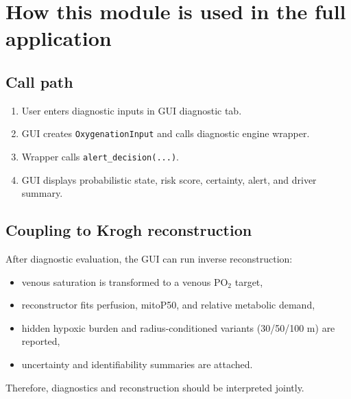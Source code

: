 \documentclass[12pt,a4paper]{article}
\begin{document}
\section{How this module is used in the full application}
\subsection{Call path}
\begin{enumerate}
    \item User enters diagnostic inputs in GUI diagnostic tab.
    \item GUI creates \texttt{OxygenationInput} and calls diagnostic engine wrapper.
    \item Wrapper calls \texttt{alert\_decision(...)}.
    \item GUI displays probabilistic state, risk score, certainty, alert, and driver summary.
\end{enumerate}

\subsection{Coupling to Krogh reconstruction}
After diagnostic evaluation, the GUI can run inverse reconstruction:
\begin{itemize}
    \item venous saturation is transformed to a venous PO$_2$ target,
    \item reconstructor fits perfusion, mitoP50, and relative metabolic demand,
    \item hidden hypoxic burden and radius-conditioned variants (30/50/100 \textmu m) are reported,
    \item uncertainty and identifiability summaries are attached.
\end{itemize}

Therefore, diagnostics and reconstruction should be interpreted jointly.
\end{document}

